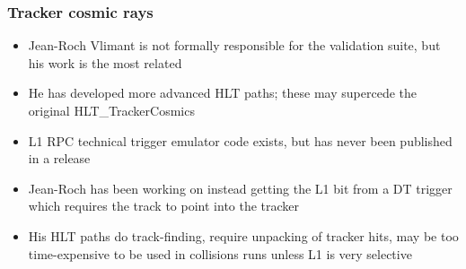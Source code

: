 \documentclass[compress]{beamer}
\begin{document}
\begin{frame}
\frametitle{Tracker cosmic rays}
\small

\begin{itemize}\setlength{\itemsep}{0.35 cm}
\item Jean-Roch Vlimant is not formally responsible for the validation suite, but his work is the most related

\item He has developed more advanced HLT paths; these may supercede the original HLT\_TrackerCosmics

\item L1 RPC technical trigger emulator code exists, but has never been published in a release

\item Jean-Roch has been working on instead getting the L1 bit from a DT trigger which requires the track to point into the tracker

\item His HLT paths do track-finding, require unpacking of tracker
  hits, may be too time-expensive to be used in collisions runs unless
  L1 is very selective

\end{itemize}
\end{frame}

\end{document}

